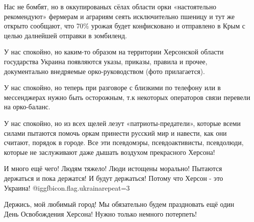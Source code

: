 Нас не бомбят, но в оккупированых сёлах области орки «настоятельно рекомендуют»
фермерам и аграриям сеять исключительно пшеницу и тут же открыто сообщают, что
70\% урожая будет конфисковано и отправлено в Крым с целью далнейшей отправки в
зомбиленд. 

У нас спокойно, но каким-то образом на территории Херсонской области
государства Украина появляются указы, приказы, правила и прочее, документально
внедряемые орко-руководством (фото прилагается). 

У нас спокойно, но теперь при разговоре с близкими по телефону или в
мессенджерах нужно быть осторожным, т.к некоторых операторов связи перевели на
орко-баланс. 

У нас спокойно, но из всех щелей лезут «патриоты-предатели», которые всеми
силами пытаются помочь оркам принести русский мир и навести, как они считают,
порядок в городе. Все эти псевдомэры, псевдоактивисты, псевдолюди, которые не
заслуживают даже дышать воздухом прекрасного Херсона!

И много ещё чего! Людям тяжело! Люди истощены морально! Пытаются держаться и
пока держатся! И будут держаться! Потому что Херсон - это Украина!
@igg{fbicon.flag.ukraina}{repeat=3}

Держись, мой любимый город! Мы обязательно будем праздновать ещё один День
Освобождения Херсона! Нужно только немного потерпеть!
